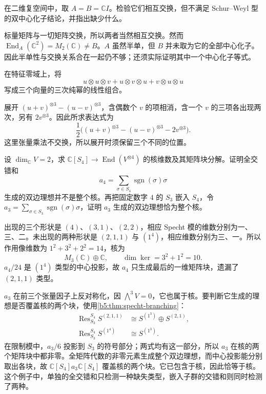 \begin{exercise}\label{b5:ex:07-commuting-insufficient}
	在二维复空间中，取 \(A=B=\mathbb C I\)。检验它们相互交换，但不满足 Schur--Weyl 型的双中心化子结论，并指出缺少什么。
\end{exercise}
\begin{solution}
	标量矩阵与一切矩阵交换，所以两者当然相互交换。然而 \(\operatorname{End}_A(\mathbb C^2)=M_2(\mathbb C)\ne B\)。\(A\) 虽然半单，但 \(B\) 并未取为它的全部中心化子。因此半单性与交换关系合在一起仍不够；还须实际证明其中一个中心化子等式。
\end{solution}

\begin{exercise}\label{b5:ex:07-polarization-cubic}
	在特征零域上，将
	\[
		u\otimes u\otimes v+u\otimes v\otimes u+v\otimes u\otimes u
	\]
	写成三个向量的三次纯幂的线性组合。
\end{exercise}
\begin{solution}
	展开 \((u+v)^{\otimes3}-(u-v)^{\otimes3}\)，含偶数个 \(v\) 的项相消，含一个 \(v\) 的三项各出现两次，另有 \(2v^{\otimes3}\)。因此所求表达式为
	\[
		\frac12\bigl((u+v)^{\otimes3}-(u-v)^{\otimes3}-2v^{\otimes3}\bigr).
	\]
	这里张量乘法不交换，所以展开时须保留三个不同的位置。
\end{solution}

\begin{exercise}\label{b5:ex:07-alternating-kernel}
	设 \(\dim_{\mathbb C}V=2\)，求 \(\mathbb C[S_4]\to\operatorname{End}(V^{\otimes4})\) 的核维数及其矩阵块分解。证明全交错和
	\[
		a_4=\sum_{\sigma\in S_4}\operatorname{sgn}(\sigma)\sigma
	\]
	生成的双边理想并不是整个核。再把固定数字 \(4\) 的 \(S_3\) 嵌入 \(S_4\)，令 \(a_3=\sum_{\sigma\in S_3}\operatorname{sgn}(\sigma)\sigma\)，证明 \(a_3\) 生成的双边理想恰为整个核。
\end{exercise}
\begin{solution}
	出现的三个形状是 \((4)\)、\((3,1)\)、\((2,2)\)，相应 Specht 模的维数分别为一、三、二。未出现的两种形状是 \((2,1,1)\) 与 \((1^4)\)，相应维数分别为三、一。所以作用像维数为 \(1^2+3^2+2^2=14\)，核为
	\[
		M_3(\mathbb C)\oplus\mathbb C, \qquad \dim\ker=3^2+1^2=10.
	\]
	\(a_4/24\) 是 \((1^4)\) 类型的中心投影，故 \(a_4\) 只生成最后的一维矩阵块，遗漏了 \((2,1,1)\) 类型。

	\(a_3\) 在前三个张量因子上反对称化，因 \(\bigwedge^3V=0\)，它也属于核。要判断它生成的理想是否覆盖核的两个块，使用\cref{b5:thm:specht-branching}：
	\[
		\begin{aligned}
			\operatorname{Res}_{S_3}^{S_4}S^{(2,1,1)}&\cong S^{(1^3)}\oplus S^{(2,1)},\\
			\operatorname{Res}_{S_3}^{S_4}S^{(1^4)}&\cong S^{(1^3)}.
		\end{aligned}
	\]
	在限制模中，\(a_3/6\) 投影到 \(S_3\) 的符号部分；两式均有这一部分，所以 \(a_3\) 在核的两个矩阵块中都非零。全矩阵代数的非零元素生成整个双边理想，而中心投影能分别取出各块，故 \(\mathbb C[S_4]a_3\mathbb C[S_4]\) 覆盖核的两个块。它已包含于核，因此恰等于核。这个例子中，单独的全交错和只检测一种缺失类型，嵌入子群的交错和则同时检测了两种。
\end{solution}

